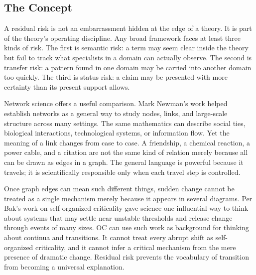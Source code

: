 \documentclass[11pt,a4paper,openany]{book}
\begin{document}
\subsection{The Concept}
A residual risk is not an embarrassment hidden at the edge of a theory. It is part of the theory's operating discipline. Any broad framework faces at least three kinds of risk. The first is semantic risk: a term may seem clear inside the theory but fail to track what specialists in a domain can actually observe. The second is transfer risk: a pattern found in one domain may be carried into another domain too quickly. The third is status risk: a claim may be presented with more certainty than its present support allows. \cite{kauffman_autocatalytic,raf_networks}\par
Network science offers a useful comparison. Mark Newman's work helped establish networks as a general way to study nodes, links, and large-scale structure across many settings. The same mathematics can describe social ties, biological interactions, technological systems, or information flow. Yet the meaning of a link changes from case to case. A friendship, a chemical reaction, a power cable, and a citation are not the same kind of relation merely because all can be drawn as edges in a graph. The general language is powerful because it travels; it is scientifically responsible only when each travel step is controlled.\par
Once graph edges can mean such different things, sudden change cannot be treated as a single mechanism merely because it appears in several diagrams. Per Bak's work on self-organized criticality gave science one influential way to think about systems that may settle near unstable thresholds and release change through events of many sizes. OC can use such work as background for thinking about continua and transitions. It cannot treat every abrupt shift as self-organized criticality, and it cannot infer a critical mechanism from the mere presence of dramatic change. Residual risk prevents the vocabulary of transition from becoming a universal explanation.\par
\end{document}
